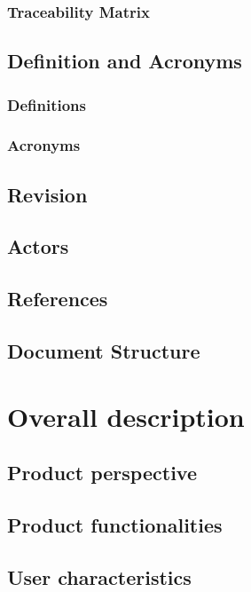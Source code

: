 \documentclass[12pt]{article}
\begin{document}
	\subsubsection{Traceability Matrix}
	
	\subsection{Definition and Acronyms}
	\subsubsection{Definitions}
	\subsubsection{Acronyms}
	\subsection{Revision}
	\subsection{Actors}
	
	\subsection{References}
	
	\subsection{Document Structure}
	
	\clearpage
	\section{Overall description}
	\subsection{Product perspective}
	
	\subsection{Product functionalities}
	
	\subsection{User characteristics}
	
	
\end{document}
